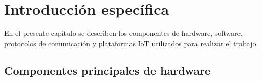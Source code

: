 \chapter{Introducción específica} %

\label{Chapter2}

En el presente capítulo se describen los componentes de hardware, software, protocolos de comunicación y plataformas IoT utilizados para realizar el trabajo.

\section{Componentes principales de hardware}
\label{sec:ejemplo}

